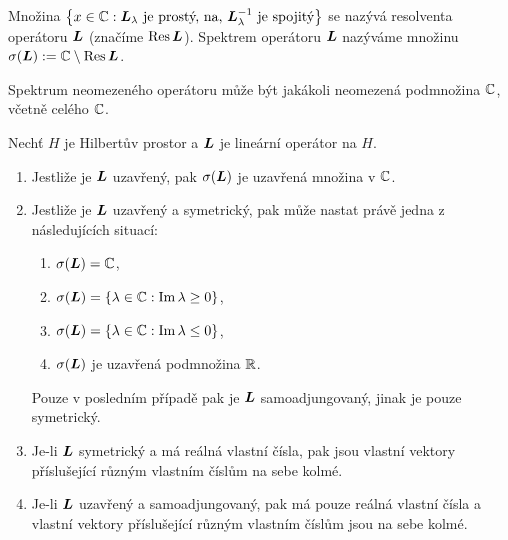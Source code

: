 \begin{definition}
Množina $ \left\lbrace x \in \mathbb{C} : \boldsymbol{L}_\lambda \text{ je prostý, na, } \boldsymbol{L}_\lambda^{-1} \text{ je spojitý} \right\rbrace$ se nazývá resolventa operátoru $\boldsymbol{L}$ (značíme $\text{Res}\, \boldsymbol{L}$). Spektrem operátoru $\boldsymbol{L}$ nazýváme množinu $\sigma(\boldsymbol{L}) := \mathbb{C} \setminus \text{Res}\, \boldsymbol{L}$.
\end{definition}

\begin{remark}
Spektrum neomezeného operátoru může být jakákoli neomezená podmnožina $\mathbb{C}$, včetně celého $\mathbb{C}$.
\end{remark}

\begin{theorem}
Nechť $H$ je Hilbertův prostor a $\boldsymbol{L}$ je lineární operátor na $H$. \begin{enumerate}
    \item Jestliže je $\boldsymbol{L}$ uzavřený, pak $\sigma(\boldsymbol{L})$ je uzavřená množina v $\mathbb{C}$.
    \item Jestliže je $\boldsymbol{L}$ uzavřený a symetrický, pak může nastat právě jedna z následujících situací: \begin{enumerate}
        \item $\sigma(\boldsymbol{L}) = \mathbb{C}$,
        \item $\sigma(\boldsymbol{L}) = \{ \lambda \in \mathbb{C} : \mathrm{Im}\, \lambda \geq 0 \}$,
         \item $\sigma(\boldsymbol{L}) = \{ \lambda \in \mathbb{C} : \mathrm{Im} \, \lambda \leq 0 \}$,
          \item $\sigma(\boldsymbol{L})$ je uzavřená podmnožina $\mathbb{R}$.
    \end{enumerate}
    Pouze v posledním případě pak je $\boldsymbol{L}$ samoadjungovaný, jinak je pouze symetrický.
    \item Je-li $\boldsymbol{L}$ symetrický a má reálná vlastní čísla, pak jsou vlastní vektory příslušející různým vlastním číslům na sebe kolmé.
    \item Je-li $\boldsymbol{L}$ uzavřený a samoadjungovaný, pak má pouze reálná vlastní čísla a vlastní vektory příslušející různým vlastním číslům jsou na sebe kolmé.
\end{enumerate}
\end{theorem}

